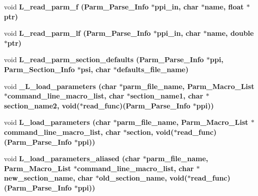 \begin{CompactItemize}
\item 
void \bf{L\_\-read\_\-parm\_\-f} (\bf{Parm\_\-Parse\_\-Info} $\ast$ppi\_\-in, char $\ast$\bf{name}, float $\ast$ptr)
\item 
void \bf{L\_\-read\_\-parm\_\-lf} (\bf{Parm\_\-Parse\_\-Info} $\ast$ppi\_\-in, char $\ast$\bf{name}, double $\ast$ptr)
\item 
void \bf{L\_\-read\_\-parm\_\-section\_\-defaults} (\bf{Parm\_\-Parse\_\-Info} $\ast$ppi, \bf{Parm\_\-Section\_\-Info} $\ast$psi, char $\ast$defaults\_\-file\_\-name)
\item 
void \bf{\_\-L\_\-load\_\-parameters} (char $\ast$parm\_\-file\_\-name, \bf{Parm\_\-Macro\_\-List} $\ast$command\_\-line\_\-macro\_\-list, char $\ast$section\_\-name1, char $\ast$section\_\-name2, void($\ast$read\_\-func)(\bf{Parm\_\-Parse\_\-Info} $\ast$ppi))
\item 
void \bf{L\_\-load\_\-parameters} (char $\ast$parm\_\-file\_\-name, \bf{Parm\_\-Macro\_\-List} $\ast$command\_\-line\_\-macro\_\-list, char $\ast$section, void($\ast$read\_\-func)(\bf{Parm\_\-Parse\_\-Info} $\ast$ppi))
\item 
void \bf{L\_\-load\_\-parameters\_\-aliased} (char $\ast$parm\_\-file\_\-name, \bf{Parm\_\-Macro\_\-List} $\ast$command\_\-line\_\-macro\_\-list, char $\ast$new\_\-section\_\-name, char $\ast$old\_\-section\_\-name, void($\ast$read\_\-func)(\bf{Parm\_\-Parse\_\-Info} $\ast$ppi))
\end{CompactItemize}
